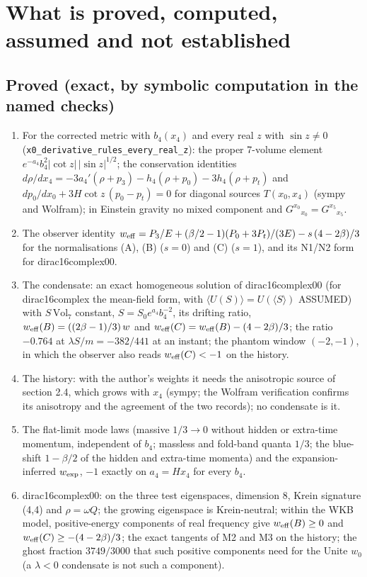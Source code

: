 \documentclass[11pt]{article}
\begin{document}
\section{What is proved, computed, assumed and not established}

\subsection{Proved (exact, by symbolic computation in the named checks)}

\begin{enumerate}
\item For the corrected metric with $b_4(x_4)$ and every real $z$ with $\sin z \neq 0$ (\texttt{x0\_deriv\allowbreak{}ative\_ru\allowbreak{}les\_ever\allowbreak{}y\_real\_z}): the proper 7-volume element $e^{-a_4}b_4^2\lvert\cot z\rvert\,\lvert\sin z\rvert^{1/2}$; the conservation identities $d\rho/dx_4 = -3a_4'(\rho + p_3) - h_4(\rho + p_0) - 3h_4(\rho + p_t)$ and $dp_0/dx_0 + 3H\cot z\,(p_0 - p_t) = 0$ for diagonal sources $T(x_0, x_4)$ (sympy and Wolfram); in Einstein gravity no mixed component and $G^{x_0}{}_{x_0} = G^{x_5}{}_{x_5}$.
\item The observer identity $w_{\rm eff} = P_3/E + (\beta/2 - 1)(P_0 + 3P_t)/(3E) - s\,(4 - 2\beta)/3$ for the normalisations (A), (B) ($s = 0$) and (C) ($s = 1$), and its N1/N2 form for dirac16complex00.
\item The condensate: an exact homogeneous solution of dirac16complex00 (for dirac16complex the mean-field form, with $\langle U(S)\rangle = U(\langle S\rangle)$ ASSUMED) with $S\,\mathrm{Vol}_7$ constant, $S = S_0e^{a_4}b_4^{-2}$, its drifting ratio, $w_{\rm eff}(B) = ((2\beta - 1)/3)\,w$ and $w_{\rm eff}(C) = w_{\rm eff}(B) - (4 - 2\beta)/3$; the ratio $-0.764$ at $\lambda S/m = -382/441$ at an instant; the phantom window $(-2, -1)$, in which the observer also reads $w_{\rm eff}(C) < -1$ on the history.
\item The history: with the author's weights it needs the anisotropic source of section 2.4, which grows with $x_4$ (sympy; the Wolfram verification confirms its anisotropy and the agreement of the two records); no condensate is it.
\item The flat-limit mode laws (massive $1/3 \to 0$ without hidden or extra-time momentum, independent of $b_4$; massless and fold-band quanta $1/3$; the blue-shift $1 - \beta/2$ of the hidden and extra-time momenta) and the expansion-inferred $w_{\rm exp}$, $-1$ exactly on $a_4 = Hx_4$ for every $b_4$.
\item dirac16complex00: on the three test eigenspaces, dimension 8, Krein signature (4,4) and $\rho = \omega Q$; the growing eigenspace is Krein-neutral; within the WKB model, positive-energy components of real frequency give $w_{\rm eff}(B) \geq 0$ and $w_{\rm eff}(C) \geq -(4 - 2\beta)/3$; the exact tangents of M2 and M3 on the history; the ghost fraction $3749/3000$ that such positive components need for the Unite $w_0$ (a $\lambda < 0$ condensate is not such a component).
\end{enumerate}
\end{document}
